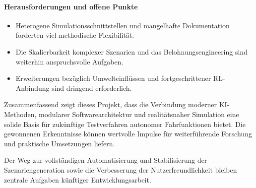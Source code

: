 \paragraph{Herausforderungen und offene Punkte}
\begin{itemize}
    \item Heterogene Simulationsschnittstellen und mangelhafte Dokumentation forderten viel methodische Flexibilität.
    \item Die Skalierbarkeit komplexer Szenarien und das Belohnungsengineering sind weiterhin anspruchsvolle Aufgaben.
    \item Erweiterungen bezüglich Umwelteinflüssen und fortgeschrittener RL-Anbindung sind dringend erforderlich.
\end{itemize}

Zusammenfassend zeigt dieses Projekt, dass die Verbindung moderner KI-Methoden, modularer Softwarearchitektur und realitätsnaher Simulation eine solide Basis für zukünftige Testverfahren autonomer Fahrfunktionen bietet. Die gewonnenen Erkenntnisse können wertvolle Impulse für weiterführende Forschung und praktische Umsetzungen liefern.

Der Weg zur vollständigen Automatisierung und Stabilisierung der Szenariengeneration sowie die Verbesserung der Nutzerfreundlichkeit bleiben zentrale Aufgaben künftiger Entwicklungsarbeit.
